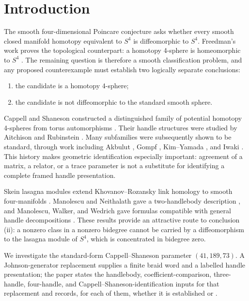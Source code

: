 \section{Introduction}

The smooth four-dimensional Poincare conjecture asks whether every smooth
closed manifold homotopy equivalent to $S^4$ is diffeomorphic to $S^4$.
Freedman's work proves the topological counterpart: a homotopy 4-sphere is
homeomorphic to $S^4$ \cite{Freedman1982}.  The remaining question is
therefore a smooth classification problem, and any proposed counterexample
must establish two logically separate conclusions:
\begin{enumerate}
\item the candidate is a homotopy 4-sphere;
\item the candidate is not diffeomorphic to the standard smooth sphere.
\end{enumerate}

Cappell and Shaneson constructed a distinguished family of potential
homotopy 4-spheres from torus automorphisms \cite{CappellShaneson1976}.
Their handle structures were studied by Aitchison and Rubinstein
\cite{AitchisonRubinstein1984}.  Many subfamilies were subsequently shown to
be standard, through work including Akbulut \cite{Akbulut2010}, Gompf
\cite{Gompf2010}, Kim--Yamada \cite{KimYamada2017}, and Iwaki
\cite{Iwaki2024}.  This history makes geometric identification especially
important: agreement of a matrix, a relator, or a trace parameter is not a
substitute for identifying a complete framed handle presentation.

Skein lasagna modules extend Khovanov--Rozansky link homology to smooth
four-manifolds \cite{MorrisonWalkerWedrich2019}.  Manolescu and Neithalath
gave a two-handlebody description \cite{ManolescuNeithalath2020}, and
Manolescu, Walker, and Wedrich gave formulas compatible with general handle
decompositions \cite{ManolescuWalkerWedrich2023}.  These results provide an
attractive route to conclusion (ii): a nonzero class in a nonzero bidegree
cannot be carried by a diffeomorphism to the lasagna module of $S^4$, which
is concentrated in bidegree zero.

We investigate the standard-form Cappell--Shaneson parameter
$(41,189,73)$.  A Johnson-generator replacement supplies a finite braid word
and a labelled handle presentation; the paper states the handlebody,
coefficient-comparison, three-handle, four-handle, and
Cappell--Shaneson-identification inputs for that replacement and records,
for each of them, whether it is established or \Open.


